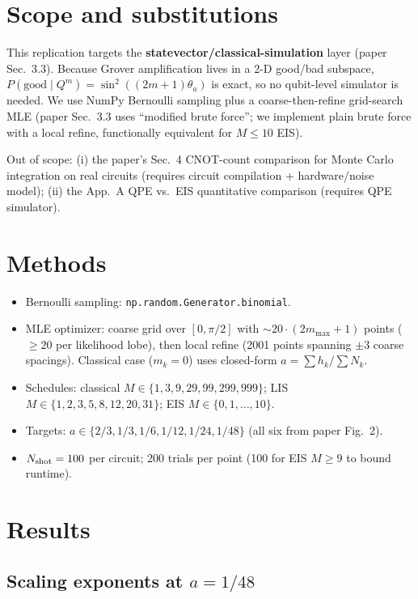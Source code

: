 \documentclass[11pt]{article}
\begin{document}
\section{Scope and substitutions}

This replication targets the \textbf{statevector/classical-simulation} layer
(paper Sec.\ 3.3). Because Grover amplification lives in a 2-D good/bad
subspace, $P(\mathrm{good}\mid Q^m)=\sin^2((2m+1)\theta_a)$ is exact, so no
qubit-level simulator is needed. We use NumPy Bernoulli sampling plus a
coarse-then-refine grid-search MLE (paper Sec.\ 3.3 uses ``modified brute
force''; we implement plain brute force with a local refine, functionally
equivalent for $M\leq 10$ EIS).

Out of scope: (i) the paper's Sec.\ 4 CNOT-count comparison for Monte Carlo
integration on real circuits (requires circuit compilation + hardware/noise
model); (ii) the App.\ A QPE vs.\ EIS quantitative comparison (requires QPE
simulator).

\section{Methods}

\begin{itemize}
    \item Bernoulli sampling: \verb|np.random.Generator.binomial|.
    \item MLE optimizer: coarse grid over $[0,\pi/2]$ with
    $\sim 20\cdot(2m_{\max}+1)$ points (${\geq}20$ per likelihood lobe), then
    local refine (2001 points spanning $\pm 3$ coarse spacings).
    Classical case ($m_k=0$) uses closed-form $\hat{a}=\sum h_k / \sum N_k$.
    \item Schedules: classical $M\in\{1,3,9,29,99,299,999\}$;
    LIS $M\in\{1,2,3,5,8,12,20,31\}$; EIS $M\in\{0,1,\dots,10\}$.
    \item Targets: $a\in\{2/3, 1/3, 1/6, 1/12, 1/24, 1/48\}$
    (all six from paper Fig.\ 2).
    \item $N_{\rm shot}=100$ per circuit; 200 trials per point (100 for EIS
    $M\geq 9$ to bound runtime).
\end{itemize}

\section{Results}

\subsection{Scaling exponents at \boldmath $a=1/48$}
\end{document}
